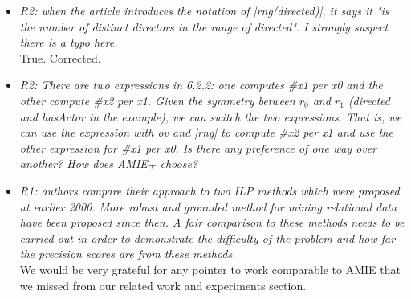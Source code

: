 \begin{figure*}[t!]
\begin{minipage}{.8\textwidth}
\begin{itemize}
   \item \textit{R2: when the article introduces the notation of |rng(directed)|, it says it "is the number of distinct directors in the range of directed". I strongly suspect there is a typo here. \\  }
   True. Corrected.
   
   \item \textit{R2: There are two expressions in 6.2.2: one computes \#x1 per x0 and the other compute \#x2 per x1. 
   Given the symmetry between $r_0$ and $r_1$ (directed and hasActor in the example), we can switch the two expressions. 
   That is, we can use the expression with ov and |rng| to compute \#x2 per x1 and use the other expression for \#x1 per x0. 
   Is there any preference of one way over another? How does AMIE+ choose?\\  }
   
   
   
   
   
   
   \item \textit{R1: authors compare their approach to two ILP methods which were proposed at earlier 2000. More robust and grounded method for mining relational data have been proposed since then. A fair
comparison to these methods needs to be carried out in order to demonstrate the difficulty of the problem and how far the precision scores are from these methods.\\  }
We would be very grateful for any pointer to work comparable to AMIE that we missed from our related work and experiments section.

   
   
     \end{itemize}
\end{minipage}
\end{figure*}

